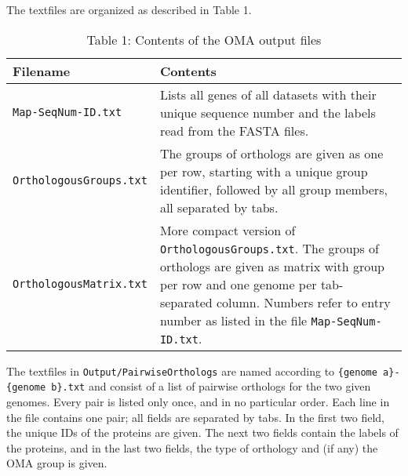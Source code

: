 \documentclass{scrartcl}
\begin{document}
\noindent The textfiles are organized as described in Table 1.
\begin{table}[!ht]
\begin{tabular}{ l p{10cm} }
\textbf{Filename} & \textbf{Contents}\\
\hline
\texttt{Map-SeqNum-ID.txt} & 
\noindent Lists all genes of all datasets  
                    with their unique sequence number and the labels read from
                    the FASTA files.
\\
\texttt{OrthologousGroups.txt} & 
\noindent The groups of orthologs are
                    given as one per row, starting with a unique group
                    identifier, followed by all group members, all separated
                    by tabs.
\\
\texttt{OrthologousMatrix.txt} & 
\noindent More compact version of \texttt{OrthologousGroups.txt}. The groups of orthologs
                    are given as matrix with group per row and one genome
                    per tab-separated column. Numbers refer to entry number as
                    listed in the file \texttt{Map-SeqNum-ID.txt}.
\\
\end{tabular}
\caption{Table 1: Contents of the OMA output files}
\end{table}

\noindent The textfiles in \texttt{Output/PairwiseOrthologs} are named according to \texttt{\{genome a\}-\{genome b\}.txt} and consist of a list of pairwise orthologs for the two given
            genomes. Every pair is listed only once, and in no particular
            order. Each line in the file contains one pair; all fields are 
            separated by tabs. In the first two field, the unique IDs of the
            proteins are given. The next two fields contain the labels of
            the proteins, and in the last two fields, the type of orthology
            and (if any) the OMA group is given.
\end{document}
